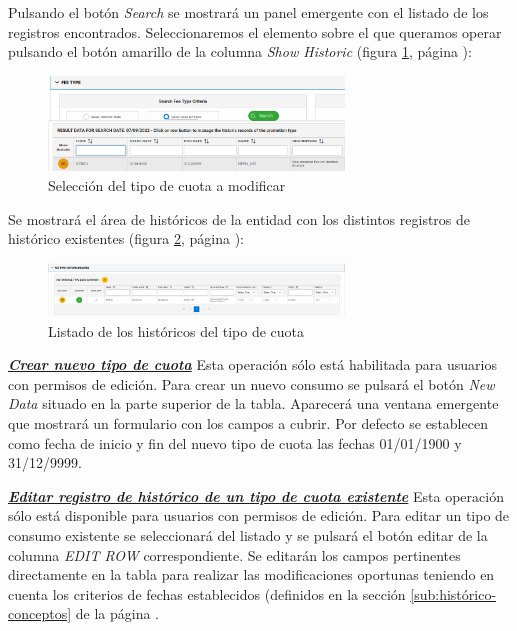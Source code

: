 Pulsando el botón \emph{Search} se mostrará un panel emergente con el listado de los registros encontrados. Seleccionaremos el elemento sobre el que queramos operar pulsando el botón amarillo de la columna \emph{Show Historic} (figura \ref{fig:seleccion-tipo-cuota}, página \pageref{fig:seleccion-tipo-cuota}):

\begin{figure}[H]
  \centering
  \includegraphics[width=0.70\textwidth]{imaxes/seleccion-tipo-cuota.png}
  \caption{Selección del tipo de cuota a modificar}
  \label{fig:seleccion-tipo-cuota}
\end{figure}


Se mostrará el área de históricos de la entidad con los distintos registros de histórico existentes (figura \ref{fig:listado-historicos-tipo-cuota}, página \pageref{fig:listado-historicos-tipo-cuota}):

\begin{figure}[H]
  \centering
  \includegraphics[width=0.70\textwidth]{imaxes/listado-historicos-tipo-cuota.png}
  \caption{Listado de los históricos del tipo de cuota}
  \label{fig:listado-historicos-tipo-cuota}
\end{figure}



\underline{\textsl{\textbf{Crear nuevo tipo de cuota}}}\newline
Esta operación sólo está habilitada para usuarios con permisos de edición.
Para crear un nuevo consumo se pulsará el botón \textit{New Data} situado en la parte superior de la tabla. Aparecerá una ventana emergente que mostrará un formulario con los campos a cubrir. Por defecto se establecen como fecha de inicio y fin del nuevo tipo de cuota las fechas 01/01/1900 y 31/12/9999.

\underline{\textsl{\textbf{Editar registro de histórico de un tipo de cuota existente}}}\newline
Esta operación sólo está disponible para usuarios con permisos de edición.
Para editar un tipo de consumo existente se seleccionará del listado y se pulsará el botón editar de la columna \textit{EDIT ROW} correspondiente. Se editarán los campos pertinentes directamente en la tabla para realizar las modificaciones oportunas teniendo en cuenta los criterios de fechas establecidos (definidos en la sección \ref{sub:histórico-conceptos} de la página \pageref{sub:histórico-conceptos}.

